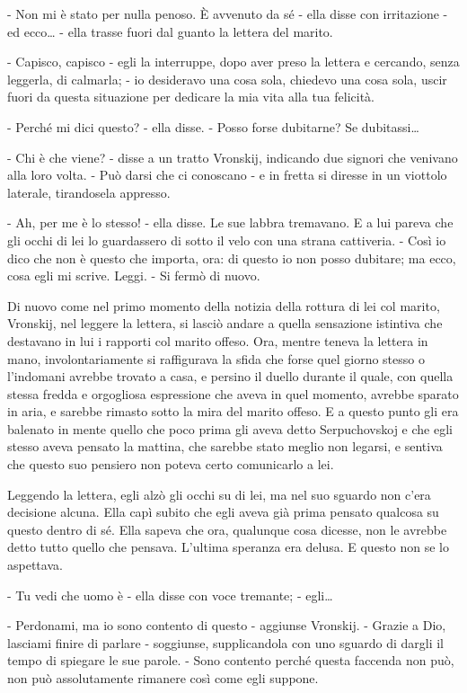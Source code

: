 - Non mi è stato per nulla penoso. È avvenuto da sé - ella disse con irritazione - ed ecco\ldots{} - ella trasse fuori dal guanto la lettera del marito. 

- Capisco, capisco - egli la interruppe, dopo aver preso la lettera e cercando, senza leggerla, di calmarla; - io desideravo una cosa sola, chiedevo una cosa sola, uscir fuori da questa situazione per dedicare la mia vita alla tua felicità. 

- Perché mi dici questo? - ella disse. - Posso forse dubitarne? Se dubitassi\ldots{} 

- Chi è che viene? - disse a un tratto Vronskij, indicando due signori che venivano alla loro volta. - Può darsi che ci conoscano - e in fretta si diresse in un viottolo laterale, tirandosela appresso. 

- Ah, per me è lo stesso! - ella disse. Le sue labbra tremavano. E a lui pareva che gli occhi di lei lo guardassero di sotto il velo con una strana cattiveria. - Così io dico che non è questo che importa, ora: di questo io non posso dubitare; ma ecco, cosa egli mi scrive. Leggi. - Si fermò di nuovo. 

Di nuovo come nel primo momento della notizia della rottura di lei col marito, Vronskij, nel leggere la lettera, si lasciò andare a quella sensazione istintiva che destavano in lui i rapporti col marito offeso. Ora, mentre teneva la lettera in mano, involontariamente si raffigurava la sfida che forse quel giorno stesso o l'indomani avrebbe trovato a casa, e persino il duello durante il quale, con quella stessa fredda e orgogliosa espressione che aveva in quel momento, avrebbe sparato in aria, e sarebbe rimasto sotto la mira del marito offeso. E a questo punto gli era balenato in mente quello che poco prima gli aveva detto Serpuchovskoj e che egli stesso aveva pensato la mattina, che sarebbe stato meglio non legarsi, e sentiva che questo suo pensiero non poteva certo comunicarlo a lei. 

Leggendo la lettera, egli alzò gli occhi su di lei, ma nel suo sguardo non c'era decisione alcuna. Ella capì subito che egli aveva già prima pensato qualcosa su questo dentro di sé. Ella sapeva che ora, qualunque cosa dicesse, non le avrebbe detto tutto quello che pensava. L'ultima speranza era delusa. E questo non se lo aspettava. 

- Tu vedi che uomo è - ella disse con voce tremante; - egli\ldots{} 

- Perdonami, ma io sono contento di questo - aggiunse Vronskij. - Grazie a Dio, lasciami finire di parlare - soggiunse, supplicandola con uno sguardo di dargli il tempo di spiegare le sue parole. - Sono contento perché questa faccenda non può, non può assolutamente rimanere così come egli suppone. 

